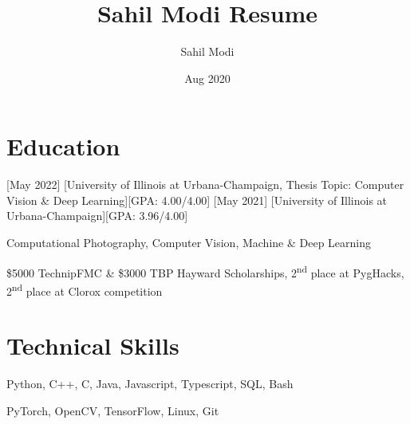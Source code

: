 \documentclass{article}
\title{Sahil Modi Resume}
\author{Sahil Modi}
\date{Aug 2020}
\begin{document}
\BgThispage


\makecvtitle %

\section{Education}
[May 2022]
[University of Illinois at Urbana-Champaign, Thesis Topic: Computer Vision \& Deep Learning][GPA: 4.00/4.00]
\vspace{0.2cm}
[May 2021]
[University of Illinois at Urbana-Champaign][GPA: 3.96/4.00]
\begin{description}[widest=Coursework]
    \item[Coursework]	Computational Photography, Computer Vision, Machine \& Deep Learning
    \item[Awards]	\$5000 TechnipFMC \& \$3000 TBP Hayward Scholarships,  2\textsuperscript{nd} place at PygHacks, 2\textsuperscript{nd} place at Clorox competition
\end{description}

\section{Technical Skills}
\begin{description}[widest=Frameworks]
    \item[Languages]	Python, C++, C, Java, Javascript, Typescript, SQL, Bash
    \item[Frameworks]	PyTorch, OpenCV, TensorFlow, Linux, Git
\end{description}
\end{document}
